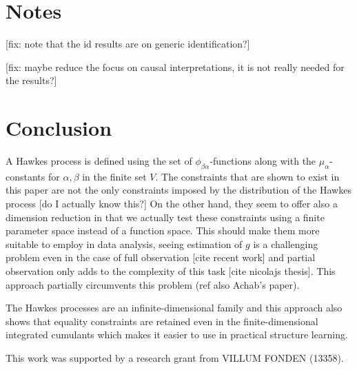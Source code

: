 \documentclass[accepted]{uai2021} %
\begin{document}
\section{Notes}

[fix: note that the id results are on generic identification?]

[fix: maybe reduce the focus on causal interpretations, it is not really needed 
for 
the results?]


\section{Conclusion}

A Hawkes process is defined using the set of $\phi_{\beta\alpha}$-functions 
along 
with the $\mu_\alpha$-constants for $\alpha,\beta$ in the finite set $V$. The 
constraints that are shown to exist in this paper are not the only constraints 
imposed by the distribution of the Hawkes process [do I actually know this?] On 
the other hand, they seem to offer also a dimension reduction in that we 
actually test these constraints using a finite parameter space instead of a 
function space. This should make them more suitable to employ in data analysis, 
seeing estimation of $g$ is a challenging problem even in the case of full 
observation [cite recent work] and partial observation only adds to the 
complexity of this task [cite nicolajs thesis]. This approach partially 
circumvents this problem (ref also Achab's paper).

The Hawkes processes are an infinite-dimensional family and this approach also 
shows that equality constraints are retained even in the finite-dimensional 
integrated cumulants which makes it easier to use in practical structure 
learning.




\begin{contributions} %

\end{contributions}

\begin{acknowledgements} %
    This work was supported by a research grant from
    VILLUM FONDEN (13358).
\end{acknowledgements}
\end{document}
